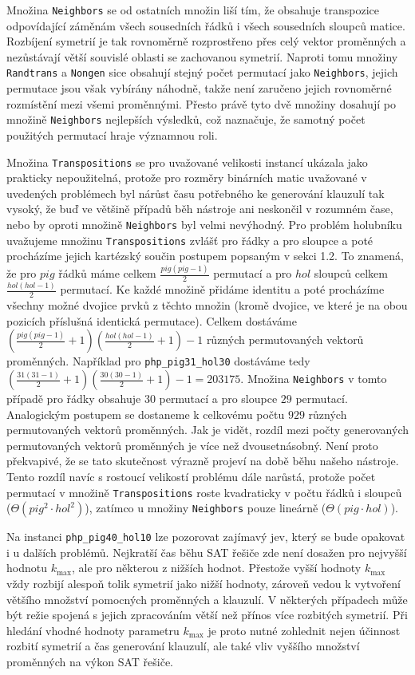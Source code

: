 Množina \texttt{Neighbors} se od ostatních množin liší tím, že obsahuje transpozice odpovídající záměnám všech sousedních řádků i všech sousedních sloupců matice. Rozbíjení symetrií je tak rovnoměrně rozprostřeno přes celý vektor proměnných a nezůstávají větší souvislé oblasti se zachovanou symetrií. Naproti tomu množiny \texttt{Randtrans} a \texttt{Nongen} sice obsahují stejný počet permutací jako \texttt{Neighbors}, jejich permutace jsou však vybírány náhodně, takže není zaručeno jejich rovnoměrné rozmístění mezi všemi proměnnými. Přesto právě tyto dvě množiny dosahují po množině \texttt{Neighbors} nejlepších výsledků, což naznačuje, že samotný počet použitých permutací hraje významnou roli.

Množina \texttt{Transpositions} se pro uvažované velikosti instancí ukázala jako prakticky nepoužitelná, protože pro rozměry binárních matic uvažované v uvedených problémech byl nárůst času potřebného ke generování klauzulí tak vysoký, že buď ve většině případů běh nástroje ani neskončil v rozumném čase, nebo by oproti množině \texttt{Neighbors} byl velmi nevýhodný. Pro problém holubníku uvažujeme množinu \texttt{Transpositions} zvlášť pro řádky a pro sloupce a poté procházíme jejich kartézský součin postupem popsaným v sekci 1.2. To znamená, že pro $pig$ řádků máme celkem $\frac{pig(pig-1)}{2}$ permutací a pro $hol$ sloupců celkem $\frac{hol(hol-1)}{2}$ permutací. Ke každé množině přidáme identitu a poté procházíme všechny možné dvojice prvků z těchto množin (kromě dvojice, ve které je na obou pozicích příslušná identická permutace). Celkem dostáváme $(\frac{pig(pig-1)}{2}+1)(\frac{hol(hol-1)}{2}+1)-1$ různých permutovaných vektorů proměnných. Například pro \texttt{php\_pig31\_hol30} dostáváme tedy $(\frac{31(31-1)}{2}+1)(\frac{30(30-1)}{2}+1)-1=203175$. Množina \texttt{Neighbors} v tomto případě pro řádky obsahuje $30$ permutací a pro sloupce $29$ permutací. Analogickým postupem se dostaneme k celkovému počtu $929$ různých permutovaných vektorů proměnných. Jak je vidět, rozdíl mezi počty generovaných permutovaných vektorů proměnných je více než dvousetnásobný. Není proto překvapivé, že se tato skutečnost výrazně projeví na době běhu našeho nástroje. Tento rozdíl navíc s rostoucí velikostí problému dále narůstá, protože počet permutací v množině \texttt{Transpositions} roste kvadraticky v počtu řádků i sloupců ($\Theta(pig^2\cdot hol^2)$), zatímco u množiny \texttt{Neighbors} pouze lineárně ($\Theta(pig\cdot hol)$).

Na instanci \texttt{php\_pig40\_hol10} lze pozorovat zajímavý jev, který se bude opakovat i u dalších problémů. Nejkratší čas běhu SAT řešiče zde není dosažen pro nejvyšší hodnotu $k_{\max}$, ale pro některou z nižších hodnot. Přestože vyšší hodnoty $k_{\max}$ vždy rozbijí alespoň tolik symetrií jako nižší hodnoty, zároveň vedou k vytvoření většího množství pomocných proměnných a klauzulí. V některých případech může být režie spojená s jejich zpracováním větší než přínos více rozbitých symetrií. Při hledání vhodné hodnoty parametru $k_{\max}$ je proto nutné zohlednit nejen účinnost rozbití symetrií a čas generování klauzulí, ale také vliv vyššího množství proměnných na výkon SAT řešiče.

